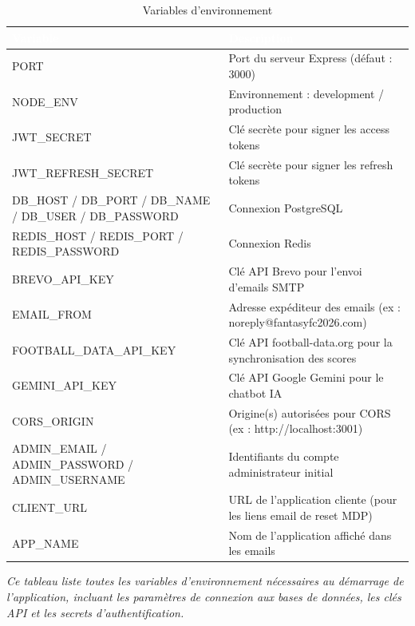 \begin{table}[!htbp]
\centering
    \begin{tabularx}{\linewidth}{|p{7cm}|X|}
        \hline
        \rowcolor{emsigreen}\textcolor{white}{\textbf{Variable}} & \textcolor{white}{\textbf{Description}} \\
        \hline
        PORT & Port du serveur Express (défaut : 3000) \\
        \hline
        NODE\_ENV & Environnement : development / production \\
        \hline
        JWT\_SECRET & Clé secrète pour signer les access tokens \\
        \hline
        JWT\_REFRESH\_SECRET & Clé secrète pour signer les refresh tokens \\
        \hline
        DB\_HOST / DB\_PORT / DB\_NAME / DB\_USER / DB\_PASSWORD & Connexion PostgreSQL \\
        \hline
        REDIS\_HOST / REDIS\_PORT / REDIS\_PASSWORD & Connexion Redis \\
        \hline
        BREVO\_API\_KEY & Clé API Brevo pour l'envoi d'emails SMTP \\
        \hline
        EMAIL\_FROM & Adresse expéditeur des emails (ex : noreply@fantasyfc2026.com) \\
        \hline
        FOOTBALL\_DATA\_API\_KEY & Clé API football-data.org pour la synchronisation des scores \\
        \hline
        GEMINI\_API\_KEY & Clé API Google Gemini pour le chatbot IA \\
        \hline
        CORS\_ORIGIN & Origine(s) autorisées pour CORS (ex : http://localhost:3001) \\
        \hline
        ADMIN\_EMAIL / ADMIN\_PASSWORD / ADMIN\_USERNAME & Identifiants du compte administrateur initial \\
        \hline
        CLIENT\_URL & URL de l'application cliente (pour les liens email de reset MDP) \\
        \hline
        APP\_NAME & Nom de l'application affiché dans les emails \\
        \hline
    \end{tabularx}
\caption{Variables d'environnement}
\end{table}

\vspace{0.2cm}
\noindent\small\textit{Ce tableau liste toutes les variables d'environnement nécessaires au démarrage de l'application, incluant les paramètres de connexion aux bases de données, les clés API et les secrets d'authentification.}\normalsize

